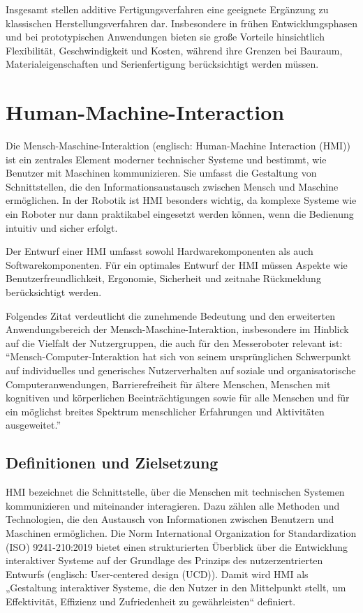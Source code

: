Insgesamt stellen additive Fertigungsverfahren eine geeignete Ergänzung zu klassischen Herstellungsverfahren dar. Insbesondere in frühen Entwicklungsphasen und bei prototypischen Anwendungen bieten sie große Vorteile hinsichtlich Flexibilität, Geschwindigkeit und Kosten, während ihre Grenzen bei Bauraum, Materialeigenschaften und Serienfertigung berücksichtigt werden müssen.

\section{Human-Machine-Interaction}
\label{cha:Human-Machine-Interaction}

Die Mensch-Maschine-Interaktion (englisch: Human-Machine Interaction (HMI)) ist ein zentrales Element moderner technischer Systeme und bestimmt, wie Benutzer mit Maschinen kommunizieren. Sie umfasst die Gestaltung von Schnittstellen, die den Informationsaustausch zwischen Mensch und Maschine ermöglichen. In der Robotik ist HMI besonders wichtig, da komplexe Systeme wie ein Roboter nur dann praktikabel eingesetzt werden können, wenn die Bedienung intuitiv und sicher erfolgt.

Der Entwurf einer HMI umfasst sowohl Hardwarekomponenten als auch Softwarekomponenten. Für ein optimales Entwurf der HMI müssen Aspekte wie Benutzerfreundlichkeit, Ergonomie, Sicherheit und zeitnahe Rückmeldung berücksichtigt werden.

Folgendes Zitat verdeutlicht die zunehmende Bedeutung und den erweiterten Anwendungsbereich der Mensch-Maschine-Interaktion, insbesondere im Hinblick auf die Vielfalt der Nutzergruppen, die auch für den Messeroboter relevant ist:
\enquote{Mensch-Computer-Interaktion hat sich von seinem ursprünglichen Schwerpunkt auf individuelles und generisches Nutzerverhalten auf soziale und organisatorische Computeranwendungen, Barrierefreiheit für ältere Menschen, Menschen mit kognitiven und körperlichen Beeinträchtigungen sowie für alle Menschen und für ein möglichst breites Spektrum menschlicher Erfahrungen und Aktivitäten ausgeweitet.} \autocite{Dix.2026}

\subsection{Definitionen und Zielsetzung}
\label{cha:Definitionen und Zielsetzung}

HMI bezeichnet die Schnittstelle, über die Menschen mit technischen Systemen kommunizieren und miteinander interagieren. Dazu zählen alle Methoden und Technologien, die den Austausch von Informationen zwischen Benutzern und Maschinen ermöglichen. Die Norm International Organization for Standardization (ISO) 9241-210:2019 \autocite{Francis.2025} bietet einen strukturierten Überblick über die Entwicklung interaktiver Systeme auf der Grundlage des Prinzips des nutzerzentrierten Entwurfs (englisch: User-centered design (UCD)). Damit wird HMI als „Gestaltung interaktiver Systeme, die den Nutzer in den Mittelpunkt stellt, um Effektivität, Effizienz und Zufriedenheit zu gewährleisten“ definiert. \autocite{Francis.2025}


